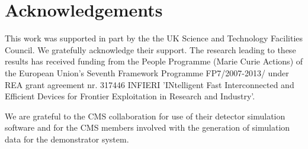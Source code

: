\documentclass[epj]{webofc}
\begin{document}
\section{Acknowledgements}
\label{sec:acknowledgments}

This work was supported in part by the the UK Science and Technology Facilities Council. We gratefully acknowledge their support. The research leading to these results has received funding from the People Programme (Marie Curie Actions) of the European Union’s Seventh Framework Programme FP7/2007-2013/ under REA grant agreement nr. 317446 INFIERI ’INtelligent Fast Interconnected and Efficient Devices for Frontier Exploitation in Research  and Industry’.

We are grateful to the CMS collaboration for use of their detector simulation software and for the CMS members involved with the generation of simulation data for the demonstrator system.


 
\end{document}
